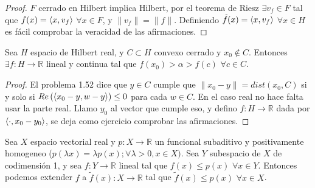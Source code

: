 \begin{proof}
  $F$ cerrado en Hilbert implica Hilbert, por el teorema de Riesz $\exists v_f
  \in F$ tal que $f(x)=\left\langle x,v_f\right\rangle$ $\forall x\in F$, y $\|v_f\|=\|f\|$.
  Definiendo $\tilde f(x)=\left\langle x,v_f\right\rangle$ $\forall x \in H$ es fácil comprobar la
  veracidad de las afirmaciones.
\end{proof}

\begin{theorem}
  Sea $H$ espacio de Hilbert real, y $C\subset H$ convexo cerrado y $x_0 \not\in C$.
  Entonces $\exists f:H\to \mathbb{R}$ lineal y continua tal que
  $f(x_0)>\alpha>f(c)$ $\forall c \in C$.
\end{theorem}

\begin{proof}
El problema 1.52 dice que $y\in C$ cumple que $\|x_0-y\|=dist(x_0,C)$ si y solo
si $Re\left( \left\langle x_0-y,w-y\right\rangle \right) \le 0$ para cada $w\in C$. En el caso
real no hace falta usar la parte real. Llamo $y_0$ al vector que cumple eso, y
defino $f:H\to \mathbb{R}$ dada por $\left\langle\cdot ,x_0-y_0\right\rangle$, se deja como
ejercicio comprobar las afirmaciones.
\end{proof}

\begin{lemma}
  Sea $X$ espacio vectorial real y $p:X\to \mathbb{R}$ un funcional subaditivo y
  positivamente homogeneo ($p(\lambda x)=\lambda p(x); \forall \lambda>0, x\in
  X)$. Sea $Y$ subespacio de $X$ de codimensión 1, y sea $f:Y\to \mathbb{R}$ 
  lineal tal que $f(x)\le p(x)$ $\forall x\in Y$. Entonces podemos extender $f$ 
  a $\tilde{f}(x):X\to \mathbb{R}$ tal que $\tilde{f}(x)\le p(x)$ $\forall x\in
  X$.
\end{lemma}

